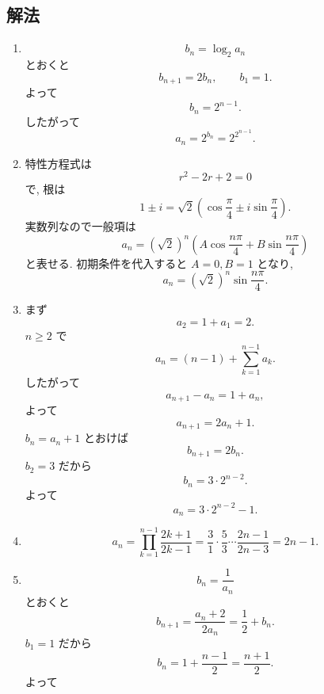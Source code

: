     \subsection{解法}\label{節：基本と応用から出題されるもの：解法}
      \begin{enumerate}[label=\textbf{問\arabic*.},leftmargin=3.8em,format=\bookitemlink{practice-basic}{solution}{problem}]
        \item \[
            b_n=\log_2 a_n
          \]
              とおくと
          \[
            b_{n+1}=2b_n,
            \qquad b_1=1.
          \]
              よって
          \[
            b_n=2^{n-1}.
          \]
              したがって
          \[
            a_n=2^{b_n}
            =2^{2^{n-1}}.
          \]
        \item 特性方程式は
          \[
            r^2-2r+2=0
          \]
              で, 根は
          \[
            1\pm i
            =\sqrt2\left(
            \cos\frac\pi4\pm i\sin\frac\pi4
            \right).
          \]
              実数列なので一般項は
          \[
            a_n=(\sqrt2)^n
            \left(
            A\cos\frac{n\pi}{4}
            +B\sin\frac{n\pi}{4}
            \right)
          \]
              と表せる.
              初期条件を代入すると \(A=0,B=1\) となり,
          \[
            a_n=(\sqrt2)^n\sin\frac{n\pi}{4}.
          \]
        \item まず
          \[
            a_2=1+a_1=2.
          \]
              \(n\ge2\) で
          \[
            a_n=(n-1)+\sum_{k=1}^{n-1}a_k.
          \]
              したがって
          \[
            a_{n+1}-a_n
            =1+a_n,
          \]
              よって
          \[
            a_{n+1}=2a_n+1.
          \]
              \(b_n=a_n+1\) とおけば
          \[
            b_{n+1}=2b_n.
          \]
              \(b_2=3\) だから
          \[
            b_n=3\cdot2^{n-2}.
          \]
              よって
          \[
            a_n=3\cdot2^{n-2}-1.
          \]
        \item \[
            a_n
            =\prod_{k=1}^{n-1}\frac{2k+1}{2k-1}
            =\frac31\cdot\frac53\cdots\frac{2n-1}{2n-3}
            =2n-1.
          \]
        \item \[
            b_n=\frac1{a_n}
          \]
              とおくと
          \[
            b_{n+1}
            =\frac{a_n+2}{2a_n}
            =\frac12+b_n.
          \]
              \(b_1=1\) だから
          \[
            b_n=1+\frac{n-1}{2}
            =\frac{n+1}{2}.
          \]
              よって
          \[
\]
\end{enumerate}
